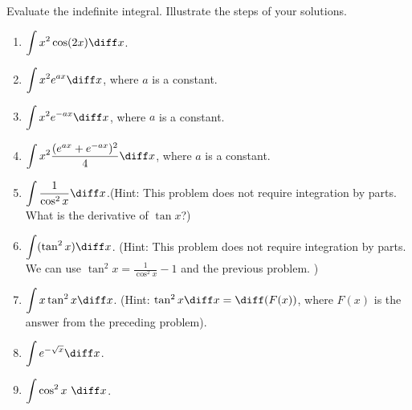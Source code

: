 Evaluate the indefinite integral. Illustrate the steps of your solutions.
\begin{multicols}{2}
\begin{enumerate}[ref={\fcProblemRef}]
\item $\displaystyle\int x^2\cos (2x) \diff x$.

\item 
$\displaystyle\int x^2e^{a x} \diff x$, where $a$ is a constant.

\item 
$\displaystyle\int x^2e^{-ax}\diff x$, where $a$ is a constant.

\item \label{problemintx^2(e^(ax)+e^(-ax))^2/4dx}
$\displaystyle\int x^2\frac{(e^{ax}+e^{-ax})^2}4\diff x$, where $a$ is a constant. 

\item $\displaystyle\int \frac{1}{\cos^2 x}\diff x$.\quad \quad (Hint: This problem does not require integration by parts. What is the derivative of $\tan x$?)

\item $\displaystyle\int (\tan^2 x) \diff x $. \quad \quad (Hint: This problem does not require integration by parts. We can use $\tan^2 x = \frac{1}{\cos^2x }-1$ and the previous problem. )


\item \label{problemintxtan^2xdx} $\displaystyle\int x \tan^2 x \diff x $. \quad \quad (Hint: $\tan^2 x \diff x= \diff (F(x))$, where $F(x)$ is the answer from the preceding problem).

\item \label{problemint(e^(-sqrtx)dx)}
$ \displaystyle 
\int e^{-\sqrt{x}}\diff x
$.

\item \label{problemintcos^2xdxviaIntByParts}
$\displaystyle\int \cos^2x ~ \diff x$.


\end{enumerate}
\end{multicols}
